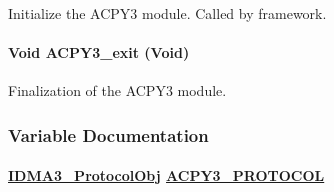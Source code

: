Initialize the ACPY3 module. Called by framework. 

\hypertarget{group___d_s_p_a_c_p_y3_ge7072f7010b53bdeab5ac76737b380af}{
\paragraph[ACPY3\_\-exit]{\setlength{\rightskip}{0pt plus 5cm}Void ACPY3\_\-exit (Void)}\hfill}
\label{group___d_s_p_a_c_p_y3_ge7072f7010b53bdeab5ac76737b380af}


Finalization of the ACPY3 module. 



\subsubsection{Variable Documentation}
\hypertarget{group___d_s_p_a_c_p_y3_g7171d01619b7fc26dbb11eb9aaf1a3b2}{
\paragraph[ACPY3\_\-PROTOCOL]{\setlength{\rightskip}{0pt plus 5cm}\hyperlink{struct_i_d_m_a3___protocol_obj}{IDMA3\_\-Protocol\-Obj} \hyperlink{group___d_s_p_a_c_p_y3_g7171d01619b7fc26dbb11eb9aaf1a3b2}{ACPY3\_\-PROTOCOL}}\hfill}
\label{group___d_s_p_a_c_p_y3_g7171d01619b7fc26dbb11eb9aaf1a3b2}


